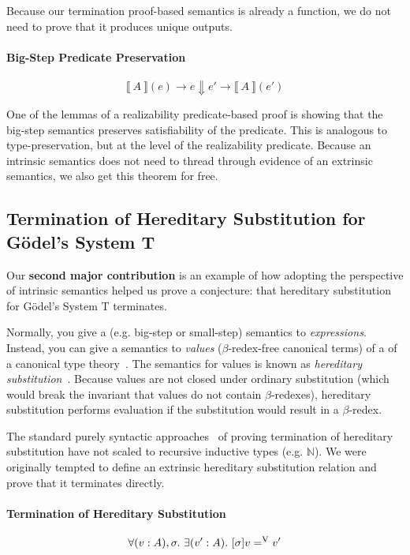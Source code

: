 \documentclass[preprint,nonatbib]{sigplanconf}
\numberwithin{subdefin}{defin}
\theoremstyle{definition}
\numberwithin{subtheorem}{theorem}
\numberwithin{sublemma}{theorem}
\numberwithin{corollary}{theorem}
\numberwithin{case}{theorem}
\numberwithin{slcase}{sublemma}
\numberwithin{scase}{subtheorem}
\numberwithin{lcase}{lemma}
\def\bigstep{\Downarrow}
\def\marr{\rightarrow}
\def\nat{\mathbb{N}}
\newcommand{\hsub}[2]{[\sigma]#1=^\con{V}#2}
\newcommand{\ascribe}[2]{(#1 : #2)}
\newcommand{\all}[1]{\forall#1.~}
\newcommand{\ex}[1]{\exists#1.~}
\newcommand{\el}[1]{\llbracket ~ #1 ~ \rrbracket}
\newcommand{\con}[1]{\textmd{#1}}
\begin{document}
Because our termination proof-based semantics is already a function,
we do not need to prove that it produces unique outputs.

\paragraph{Big-Step Predicate Preservation}

$$
\el{A}(e) \marr e \bigstep e' \marr \el{A}(e')
$$

One of the lemmas of a realizability predicate-based proof is showing that
the big-step semantics preserves satisfiability
of the predicate. This is analogous to type-preservation, but at the
level of the realizability predicate. Because an intrinsic semantics
does not need to thread through evidence of an extrinsic semantics, we
also get this theorem for free.

\subsection{Termination of Hereditary Substitution for G{\"o}del's System T}

Our {\bf second major contribution} is an example of how adopting the
perspective of intrinsic semantics helped us prove a conjecture:
that hereditary substitution for G{\"o}del's System T terminates.

Normally, you give a (e.g. big-step or small-step) semantics to
{\it expressions}. Instead, you can give a semantics to {\it values}
($\beta$-redex-free canonical terms) of a 
of a canonical type theory~\cite{TODO}. The semantics for values is
known as {\it hereditary substitution}~\cite{TODO}. Because values are
not closed under ordinary substitution (which would break the invariant that values
do not contain $\beta$-redexes), hereditary substitution
performs evaluation if the substitution would
result in a $\beta$-redex.

The standard purely syntactic approaches~\cite{TODO} of proving termination of
hereditary substitution have not scaled to recursive inductive types
(e.g. $\nat$). We were originally tempted to define an extrinsic
hereditary substitution relation and prove that it terminates directly.

\paragraph{Termination of Hereditary Substitution}

$$
\all{\ascribe{v}{A}, \sigma} \ex{\ascribe{v'}{A}} \hsub{v}{v'}
$$
\end{document}
